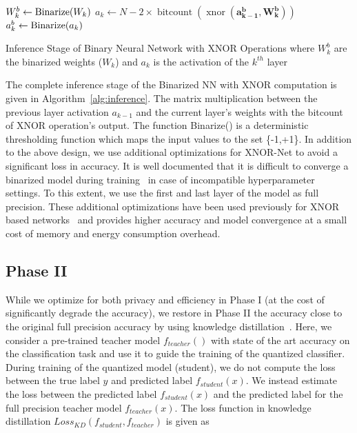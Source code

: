 \begin{algorithm}
\footnotesize
\begin{algorithmic}
        \STATE $W_k^b \leftarrow {\rm Binarize}(W_k)$
        \STATE $a_k \leftarrow N - 2\times\operatorname{bitcount}(\operatorname{xnor}(\mathbf{a_{k-1}^b}, \mathbf{W_k^b}))$
            \STATE $a_k^b \leftarrow {\rm Binarize}(a_k)$
        \ENDIF
    \ENDFOR
\end{algorithmic}
\caption{Inference Stage of Binary Neural Network with XNOR Operations where $W_k^b$ are the binarized weights ($W_k$) and $a_k$ is the activation of the $k^{th}$ layer}
\label{alg:inference}
\end{algorithm}


The complete inference stage of the Binarized NN with XNOR computation is given in Algorithm~\ref{alg:inference}.
The matrix multiplication between the previous layer activation $a_{k-1}$ and the current layer's weights with the bitcount of XNOR operation's output.
The function Binarize() is a deterministic thresholding function which maps the input values to the set \{-1,+1\}.
In addition to the above design, we use additional optimizations for XNOR-Net to avoid a significant loss in accuracy.
It is well documented that it is difficult to converge a binarized model during training~\cite{AAAI1714619} in case of incompatible hyperparameter settings. To this extent, we use the first and last layer of the model as full precision.
These additional optimizations have been used previously for XNOR based networks~\cite{8114708,rastegari2016xnornet} and provides higher accuracy and model convergence at a small cost of memory and energy consumption overhead.







\subsection{Phase II}
\label{p2}

While we optimize for both privacy and efficiency in Phase I (at the cost of significantly degrade the accuracy), we restore in Phase II the accuracy close to the original full precision accuracy by using knowledge distillation~\cite{44873}.
Here, we consider a pre-trained teacher model $f_{teacher}()$ with state of the art accuracy on the classification task and use it to guide the training of the quantized classifier.
During training of the quantized model (student), we do not compute the loss between the true label $y$ and predicted label $f_{student}(x)$.
We instead estimate the loss between the predicted label $f_{student}(x)$ and the predicted label for the full precision teacher model $f_{teacher}(x)$.
The loss function in knowledge distillation $Loss_{KD} (f_{student}, f_{teacher})$ is given as

